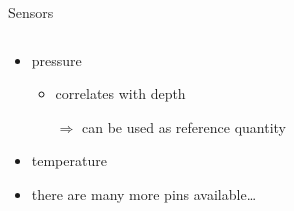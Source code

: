 \documentclass{beamer}
\begin{document}
	\begin{frame}[t]{Sensors}
		\begin{columns}[T]
			\begin{column}{0.5\textwidth}
				\begin{minipage}{\textwidth}
					\resizebox{0.9\textwidth}{!}{}
				\end{minipage}
				\begin{minipage}{\textwidth}
					\vspace{0.5cm}
					\begin{itemize}
						\item pressure
							\begin{itemize}
								\item correlates with depth
								\item[$\Rightarrow$] can be used as reference quantity
							\end{itemize}
						\item temperature
						\item there are many more pins available\dots
					\end{itemize}
				\end{minipage}
			\end{column}
			\begin{column}{0.5\textwidth}

\end{column}
\end{columns}
\end{frame}
\end{document}
